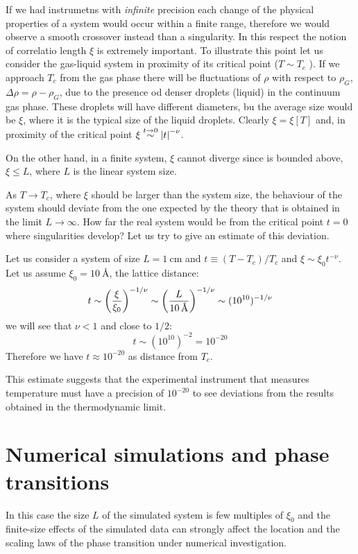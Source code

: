 \documentclass[../main/main.tex]{subfiles}
\begin{document}
If we had instrumetns with \emph{infinite} precision each change of the physical properties of a system would occur within a finite range, therefore we would observe a smooth crossover instead than a singularity. In this respect the notion of correlatio length \( \xi  \) is extremely important.
To illustrate this point let us consider the gas-liquid system in proximity of its critical point (\( T \sim T_c \) ). If we approach \( T_c \) from the gas phase there will be fluctuations of \( \rho  \) with respect to \( \rho _G \), \( \Delta \rho = \rho - \rho _G \), due to the presence od denser droplets (liquid) in the continuum gas phase.
These droplets will have different diameters, bu the average size would be \( \xi  \), where it is the typical size of the liquid droplets.
Clearly \( \xi = \xi [T] \) and, in proximity of the critical point \( \xi  \overset{t \rightarrow 0}{\sim } \abs{t}^{-\nu }   \).

On the other hand, in a finite system, \( \xi  \) cannot diverge since is bounded above, \( \xi \le L \), where \( L \) is the linear system size.

As \( T \rightarrow T_c \), where \( \xi  \) should be larger than the system size, the behaviour of the system should deviate from the one expected by the theory that is obtained in the limit \( L \rightarrow \infty  \). How far the real system would be from the critical point \( t=0 \) where singularities develop? Let us try to give an estimate of this deviation.

 Let us consider a system of size \( L = \SI{1}{\cm}  \) and \( t \equiv (T-T_c)/T_c \) and \( \xi \sim \xi _0 t^{-\nu } \). Let us assume \( \xi _0 = \SI{10}{\angstrom}  \), the lattice distance:
 \begin{equation}
   t \sim \qty(\frac{\xi }{\xi _0})^{-1/\nu } \sim \qty(\frac{L}{\SI{10}{\angstrom} })^{-1/\nu } \sim (10^{10})^{-1/\nu }
 \end{equation}
we will see that \( \nu < 1 \) and close to \( 1/2 \):
\begin{equation}
  t \sim (10^{10})^{-2 } = 10^{-20}
\end{equation}
Therefore we have \( t \approx 10^{-20} \)  as distance from \( T_c \).

This estimate suggests that the experimental instrument that measures temperature must have a precision of \( 10^{-20} \)  to see deviations from the results obtained in the thermodynamic limit.

\section{Numerical simulations and phase transitions}
In this case the size \( L \) of the simulated system is few multiples of \( \xi _0 \) and the finite-size effects of the simulated data can strongly affect the location and the scaling laws of the phase transition under numerical investigation.
\end{document}
